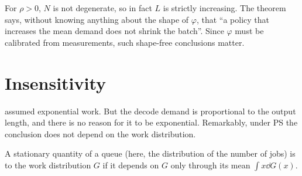 For $\rho>0$, $N$ is not degenerate, so in fact $L$ is strictly increasing. The theorem
says, without knowing anything about the shape of $\varphi$, that ``a policy that
increases the mean demand does not shrink the batch''. Since $\varphi$ must be
calibrated from measurements, such shape-free conclusions matter.

\section{Insensitivity}

 assumed exponential work. But the decode demand is proportional to the
output length, and there is no reason for it to be exponential. Remarkably, under PS
the conclusion does not depend on the work distribution.

\begin{definition}[Insensitivity]\label{L2:def:insens}
A stationary quantity of a queue (here, the distribution of the number of jobs) is
 to the work distribution $G$ if it depends on $G$ only through its
mean $\int x\dd G(x)$.
\end{definition}

